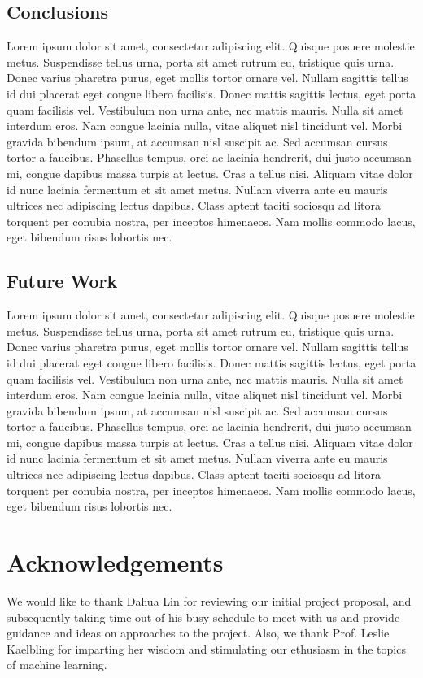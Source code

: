 \documentclass[12pt]{article}
\begin{document}
	\subsection{Conclusions}
	Lorem ipsum dolor sit amet, consectetur adipiscing elit. Quisque posuere molestie metus. Suspendisse tellus urna, porta sit amet rutrum eu, tristique quis urna. Donec varius pharetra purus, eget mollis tortor ornare vel. Nullam sagittis tellus id dui placerat eget congue libero facilisis. Donec mattis sagittis lectus, eget porta quam facilisis vel. Vestibulum non urna ante, nec mattis mauris. Nulla sit amet interdum eros. Nam congue lacinia nulla, vitae aliquet nisl tincidunt vel. Morbi gravida bibendum ipsum, at accumsan nisl suscipit ac. Sed accumsan cursus tortor a faucibus. Phasellus tempus, orci ac lacinia hendrerit, dui justo accumsan mi, congue dapibus massa turpis at lectus. Cras a tellus nisi. Aliquam vitae dolor id nunc lacinia fermentum et sit amet metus. Nullam viverra ante eu mauris ultrices nec adipiscing lectus dapibus. Class aptent taciti sociosqu ad litora torquent per conubia nostra, per inceptos himenaeos. Nam mollis commodo lacus, eget bibendum risus lobortis nec.
	\subsection{Future Work}
	Lorem ipsum dolor sit amet, consectetur adipiscing elit. Quisque posuere molestie metus. Suspendisse tellus urna, porta sit amet rutrum eu, tristique quis urna. Donec varius pharetra purus, eget mollis tortor ornare vel. Nullam sagittis tellus id dui placerat eget congue libero facilisis. Donec mattis sagittis lectus, eget porta quam facilisis vel. Vestibulum non urna ante, nec mattis mauris. Nulla sit amet interdum eros. Nam congue lacinia nulla, vitae aliquet nisl tincidunt vel. Morbi gravida bibendum ipsum, at accumsan nisl suscipit ac. Sed accumsan cursus tortor a faucibus. Phasellus tempus, orci ac lacinia hendrerit, dui justo accumsan mi, congue dapibus massa turpis at lectus. Cras a tellus nisi. Aliquam vitae dolor id nunc lacinia fermentum et sit amet metus. Nullam viverra ante eu mauris ultrices nec adipiscing lectus dapibus. Class aptent taciti sociosqu ad litora torquent per conubia nostra, per inceptos himenaeos. Nam mollis commodo lacus, eget bibendum risus lobortis nec.

\section{Acknowledgements}
	We would like to thank Dahua Lin for reviewing our initial project proposal, and subsequently taking time out of his busy schedule to meet with us and provide guidance and ideas on approaches to the project. Also, we thank Prof. Leslie Kaelbling for imparting her wisdom and stimulating our ethusiasm in the topics of machine learning.
	
\end{document}
